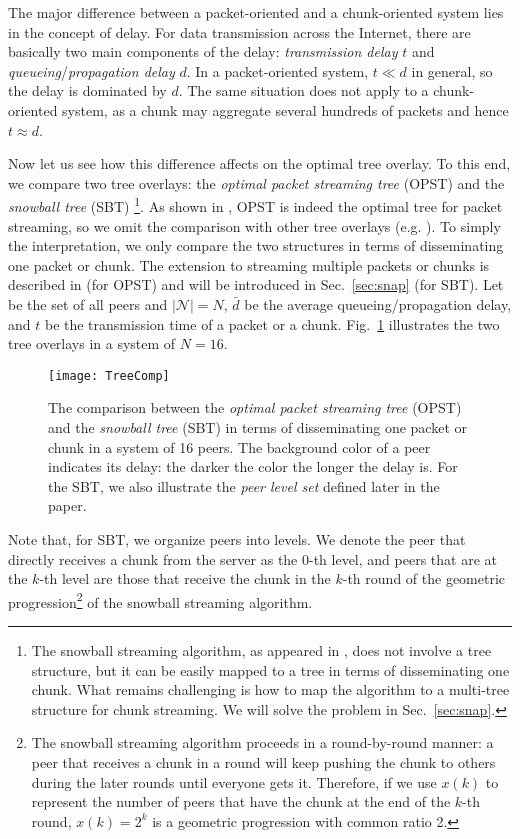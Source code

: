 \documentclass[conference]{IEEEtran}
\begin{document}
  The major difference between a packet-oriented and a chunk-oriented system lies in the concept of delay. For data transmission across the Internet, there are basically two main components of the delay: \textit{transmission delay} $t$ and \textit{queueing}/\textit{propagation delay} $d$. In a packet-oriented system, $t \ll d$ in general, so the delay is dominated by $d$. The same situation does not apply to a chunk-oriented system, as a chunk may aggregate several hundreds of packets and hence $t \approx d$.

  Now let us see how this difference affects on the optimal tree overlay. To this end, we compare two tree overlays: the \textit{optimal packet streaming tree} (OPST) \cite{LiuSJRC-SIGMETRICS08} and the \textit{snowball tree} (SBT) \cite{Liu-MM07}\footnote{The snowball streaming algorithm, as appeared in \cite{Liu-MM07}, does not involve a tree structure, but it can be easily mapped to a tree in terms of disseminating one chunk. What remains challenging is how to map the algorithm to a multi-tree structure for chunk streaming. We will solve the problem in Sec.~\ref{sec:snap}.}. As shown in \cite{LiuSJRC-SIGMETRICS08}, OPST is indeed the optimal tree for packet streaming, so we omit the comparison with other tree overlays (e.g. \cite{CastroDKNRS-SOSP03}). To simply the interpretation, we only compare the two structures in terms of disseminating one packet or chunk. The extension to streaming multiple packets or chunks is described in \cite{LiuSJRC-SIGMETRICS08} (for OPST) and will be introduced in Sec.~\ref{sec:snap} (for SBT). Let  be the set of all peers and $|\mathcal{N}| = N$, $\bar{d}$ be the average queueing/propagation delay, and $t$ be the transmission time of a packet or a chunk. Fig.~\ref{fig:treecomp} illustrates the two tree overlays in a system of $N=16$.
\begin{figure}[!h]
   \begin{center}
        \texttt{[image: TreeComp]}
\caption{The comparison between the \textit{optimal packet streaming tree} (OPST) \cite{LiuSJRC-SIGMETRICS08} and the \textit{snowball tree} (SBT) \cite{Liu-MM07} in terms of disseminating one packet or chunk in a system of 16 peers. The background color of a peer indicates its delay: the darker the color the longer the delay is. For the SBT, we also illustrate the \textit{peer level set} defined later in the paper.}\label{fig:treecomp}
   \end{center}
\end{figure}
Note that, for SBT, we organize peers into levels. We denote the peer that directly receives a chunk from the server as the 0-th level, and peers that are at the $k$-th level are those that receive the chunk in the $k$-th round of the geometric progression\footnote{The snowball streaming algorithm \cite{Liu-MM07} proceeds in a round-by-round manner: a peer that receives a chunk in a round will keep pushing the chunk to others during the later rounds until everyone gets it. Therefore, if we use $x(k)$ to represent the number of peers that have the chunk at the end of the $k$-th round, $x(k) = 2^k$ is a geometric progression with common ratio 2.} of the snowball streaming algorithm.
\end{document}
